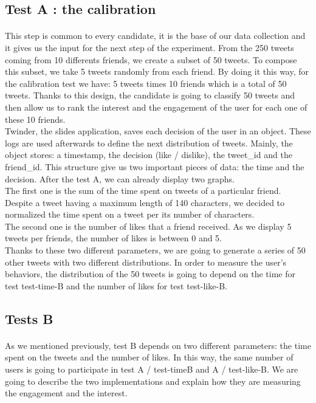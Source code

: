 \subsection{Test A : the calibration }

\paragraph{}
This step is common to every candidate, it is the base of our data collection and it gives us the input for the next step of the experiment. From the 250 tweets coming from 10 differents friends, we create a subset of 50 tweets. To compose this subset, we take 5 tweets randomly from each friend. By doing it this way, for the calibration test we have: 5 tweets times 10 friends which is a total of 50 tweets. Thanks to this design, the candidate is going to classify 50 tweets and then allow us to rank the interest and the engagement of the user for each one of these 10 friends.\\
Twinder, the slides application, saves each decision of the user in an object. These logs are used afterwards to define the next distribution of tweets. Mainly, the object stores: a timestamp, the decision (like / dislike), the tweet\_id and the friend\_id. This structure give us two important pieces of data: the time and the decision. After the test A, we can already display two graphs. \\
The first one is the sum of the time spent on tweets of a particular friend. Despite a tweet having a maximum length of 140 characters, we decided to normalized the time spent on a tweet per its number of characters.\\
The second one is the number of likes that a friend received. As we display 5 tweets per friends, the number of likes is between 0 and 5.\\
Thanks to these two different parameters, we are going to generate a series of 50 other tweets with two different distributions. In order to measure the user's behaviors, the distribution of the 50 tweets is going to depend on the time for test test-time-B and the number of likes for test test-like-B.\\


\subsection{Tests B}

\paragraph{}
As we mentioned previously, test B depends on two different parameters: the time spent on the tweets and the number of likes. In this way, the same number of users is going to participate in test A / test-timeB and A / test-like-B. We are going to describe the two implementations and explain how they are measuring the engagement and the interest.

